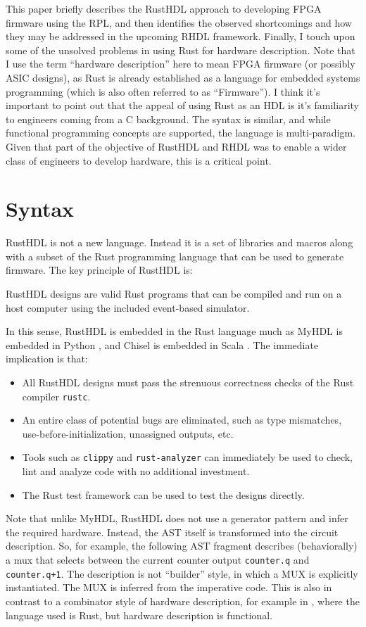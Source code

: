 \documentclass[sigplan,screen,sigconf]{acmart}
\begin{document}
This paper briefly describes
the RustHDL approach to developing FPGA firmware using the RPL, and then identifies the
observed shortcomings and how they may be addressed in the upcoming RHDL framework.  
Finally, I touch upon some of the unsolved problems in using Rust for hardware description.  Note 
that I use the term ``hardware description'' here to mean FPGA firmware (or possibly ASIC designs), 
as Rust is already established as a language for embedded systems programming (which is also often
referred to as ``Firmware'').  I think it's important to point out that the appeal of using Rust 
as an HDL is it's familiarity to engineers coming from a C background.  The syntax is similar, and
while functional programming concepts are supported, the language is multi-paradigm.  Given that 
part of the objective of RustHDL and RHDL was to enable a wider class of engineers to develop
hardware, this is a critical point.

\section{Syntax}
RustHDL is not a new language.  Instead it is a set of libraries and macros along with a 
subset of the Rust programming language that can be used to generate firmware.  The key
principle of RustHDL is:

\begin{tcolorbox}
RustHDL designs are valid Rust programs that can be compiled and run on a host computer
using the included event-based simulator.
\end{tcolorbox}

In this sense, RustHDL is embedded in the Rust language much as MyHDL is embedded in Python \cite{b3},
and Chisel is embedded in Scala \cite{b2}.  The immediate implication is that:
\begin{itemize}
  \item All RustHDL designs must pass the strenuous correctness checks of the Rust compiler \verb|rustc|.
  \item An entire class of potential bugs are eliminated, such as type mismatches, use-before-initialization,
  unassigned outputs, etc.
  \item Tools such as \verb|clippy| and \verb|rust-analyzer| can immediately be used to
  check, lint and analyze code with no additional investment.
  \item The Rust test framework can be used to test the designs directly.
\end{itemize}
Note that unlike MyHDL, RustHDL does not use a generator pattern and infer the required hardware.  Instead,
the AST itself is transformed into the circuit description.  So, for example, the following AST fragment describes
(behaviorally) a mux that selects between the current counter output \verb|counter.q| and \verb|counter.q+1|.  
The description is not ``builder'' style, in which a MUX is explicitly instantiated.  The MUX is inferred from
the imperative code.  This is also in contrast to a combinator style of hardware description, for example in \cite{b4b},
where the language used is Rust, but hardware description is functional.
\end{document}
